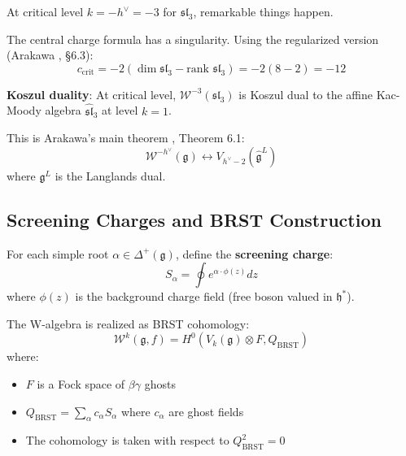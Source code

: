 \begin{example}[W₃ at Critical Level $k = -3$]
\label{ex:w3-critical-level-complete}

At critical level $k = -h^\vee = -3$ for $\mathfrak{sl}_3$, remarkable things happen.

The central charge formula has a singularity. Using the regularized version (Arakawa \cite{Ara12}, §6.3):
\begin{equation}
c_{\text{crit}} = -2(\dim \mathfrak{sl}_3 - \text{rank } \mathfrak{sl}_3) = -2(8-2) = -12
\end{equation}

\textbf{Koszul duality}: At critical level, $\mathcal{W}^{-3}(\mathfrak{sl}_3)$ is 
Koszul dual to the affine Kac-Moody algebra $\widehat{\mathfrak{sl}}_3$ at level $k = 1$.

This is Arakawa's main theorem \cite{Ara12}, Theorem 6.1:
\begin{equation}
\mathcal{W}^{-h^\vee}(\mathfrak{g}) \leftrightarrow V_{h^\vee-2}(\widehat{\mathfrak{g}}^L)
\end{equation}
where $\mathfrak{g}^L$ is the Langlands dual.
\end{example}

\subsection{Screening Charges and BRST Construction}
\label{sec:w-algebra-screening-charges-complete}

\begin{definition}
\label{def:screening-charges-arakawa}
For each simple root $\alpha \in \Delta^+(\mathfrak{g})$, define the \textbf{screening 
charge}:
\begin{equation}
S_\alpha = \oint e^{\alpha \cdot \phi(z)} dz
\end{equation}
where $\phi(z)$ is the background charge field (free boson valued in $\mathfrak{h}^*$).
\end{definition}

\begin{theorem}
\label{thm:brst-construction-arakawa-complete}
The W-algebra is realized as BRST cohomology:
\begin{equation}
\mathcal{W}^k(\mathfrak{g}, f) = H^0(V_k(\mathfrak{g}) \otimes F, Q_{\text{BRST}})
\end{equation}
where:
\begin{itemize}
\item $F$ is a Fock space of $\beta\gamma$ ghosts
\item $Q_{\text{BRST}} = \sum_{\alpha} c_\alpha S_\alpha$ where $c_\alpha$ are ghost fields
\item The cohomology is taken with respect to $Q_{\text{BRST}}^2 = 0$
\end{itemize}
\end{theorem}

